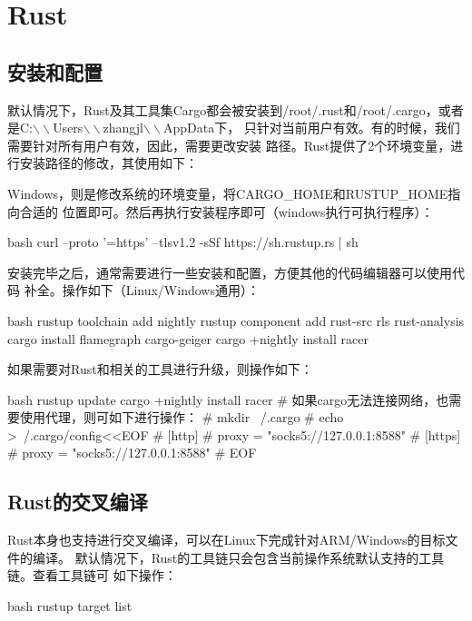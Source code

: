 \chapter{Rust}

\section{安装和配置}
默认情况下，Rust及其工具集Cargo都会被安装到/root/.rust和/root/.cargo，或者
是C:$\backslash\backslash$Users$\backslash\backslash$zhangjl$\backslash\backslash$AppData下，
只针对当前用户有效。有的时候，我们需要针对所有用户有效，因此，需要更改安装
路径。Rust提供了2个环境变量，进行安装路径的修改，其使用如下：

Windows，则是修改系统的环境变量，将CARGO\_HOME和RUSTUP\_HOME指向合适的
位置即可。然后再执行安装程序即可（windows执行可执行程序）：
\begin{code-block}{bash}
curl --proto '=https' --tlsv1.2 -sSf https://sh.rustup.rs | sh
\end{code-block}

安装完毕之后，通常需要进行一些安装和配置，方便其他的代码编辑器可以使用代码
补全。操作如下（Linux/Windows通用）：
\begin{code-block}{bash}
rustup toolchain add nightly
rustup component add rust-src rls rust-analysis
cargo install flamegraph cargo-geiger
cargo +nightly install racer
\end{code-block}

如果需要对Rust和相关的工具进行升级，则操作如下：
\begin{code-block}{bash}
rustup update
cargo +nightly install racer
# 如果cargo无法连接网络，也需要使用代理，则可如下进行操作：
# mkdir ~/.cargo
# echo >~/.cargo/config<<EOF
# [http]
# proxy = "socks5://127.0.0.1:8588"
# [https]
# proxy = "socks5://127.0.0.1:8588"
# EOF
\end{code-block}

\section{Rust的交叉编译}
Rust本身也支持进行交叉编译，可以在Linux下完成针对ARM/Windows的目标文件的编译。
默认情况下，Rust的工具链只会包含当前操作系统默认支持的工具链。查看工具链可
如下操作：
\begin{code-block}{bash}
rustup target list
\end{code-block}


